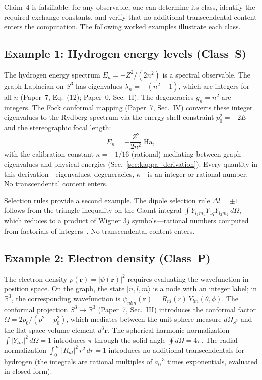 \documentclass[aps,pra,twocolumn,superscriptaddress,longbibliography]{revtex4-2}
\begin{document}
\medskip

Claim~4 is falsifiable: for any observable, one can determine
its class, identify the required exchange constants, and verify
that no additional transcendental content enters the computation.
The following worked examples illustrate each class.

\subsection{Example 1: Hydrogen energy levels (Class~S)}

The hydrogen energy spectrum $E_n = -Z^2/(2n^2)$ is a spectral
observable.  The graph Laplacian on $S^3$ has eigenvalues
$\lambda_n = -(n^2 - 1)$, which are integers for all $n$
(Paper~7, Eq.~(12); Paper~0, Sec.~II).  The degeneracies
$g_n = n^2$ are integers.  The Fock conformal mapping (Paper~7,
Sec.~IV) converts these integer eigenvalues to the Rydberg
spectrum via the energy-shell constraint $p_0^2 = -2E$
and the stereographic focal length:
\begin{equation}
  E_n = -\frac{Z^2}{2n^2}\;\text{Ha},
  \label{eq:hydrogen_class_s}
\end{equation}
with the calibration constant $\kappa = -1/16$ (rational)
mediating between graph eigenvalues and physical energies
(Sec.~\ref{sec:kappa_derivation}).  Every quantity in this
derivation---eigenvalues, degeneracies, $\kappa$---is an
integer or rational number.  No transcendental content enters.

Selection rules provide a second example.  The dipole selection
rule $\Delta l = \pm 1$ follows from the triangle inequality
on the Gaunt integral
$\int Y_{l_1 m_1} Y_{1q} Y_{l_2 m_2}\,d\Omega$, which
reduces to a product of Wigner $3j$ symbols---rational numbers
computed from factorials of integers~\cite{loutey_paper0}.
No transcendental content enters.

\subsection{Example 2: Electron density (Class~P)}

The electron density $\rho(\mathbf{r}) = |\psi(\mathbf{r})|^2$
requires evaluating the wavefunction in position space.  On the
graph, the state $|n, l, m\rangle$ is a node with an integer
label; in $\mathbb{R}^3$, the corresponding wavefunction is
$\psi_{nlm}(\mathbf{r}) = R_{nl}(r)\,Y_{lm}(\theta,\phi)$.
The conformal projection $S^3 \to \mathbb{R}^3$ (Paper~7,
Sec.~III) introduces the conformal factor
$\Omega = 2p_0/(p^2 + p_0^2)$, which mediates between the
unit-sphere measure $d\Omega_{S^3}$ and the flat-space volume
element $d^3\mathbf{r}$.  The spherical harmonic normalization
$\int |Y_{lm}|^2\,d\Omega = 1$ introduces $\pi$ through the
solid angle $\oint d\Omega = 4\pi$.  The radial normalization
$\int_0^\infty |R_{nl}|^2\,r^2\,dr = 1$ introduces no additional
transcendentals for hydrogen (the integrals are rational multiples
of $a_0^{-3}$ times exponentials, evaluated in closed form).
\end{document}
